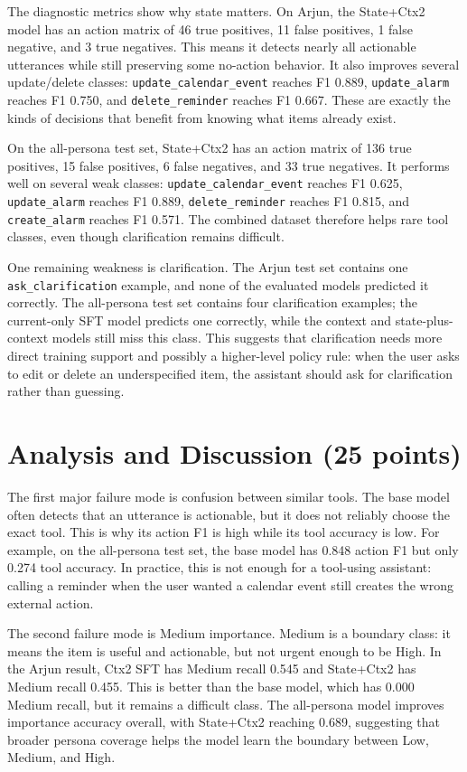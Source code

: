 \documentclass[11pt,a4paper]{article}
\begin{document}
The diagnostic metrics show why state matters. On Arjun, the State+Ctx2 model has an action matrix of 46 true positives, 11 false positives, 1 false negative, and 3 true negatives. This means it detects nearly all actionable utterances while still preserving some no-action behavior. It also improves several update/delete classes: \texttt{update\_calendar\_event} reaches F1 0.889, \texttt{update\_alarm} reaches F1 0.750, and \texttt{delete\_reminder} reaches F1 0.667. These are exactly the kinds of decisions that benefit from knowing what items already exist.

On the all-persona test set, State+Ctx2 has an action matrix of 136 true positives, 15 false positives, 6 false negatives, and 33 true negatives. It performs well on several weak classes: \texttt{update\_calendar\_event} reaches F1 0.625, \texttt{update\_alarm} reaches F1 0.889, \texttt{delete\_reminder} reaches F1 0.815, and \texttt{create\_alarm} reaches F1 0.571. The combined dataset therefore helps rare tool classes, even though clarification remains difficult.

One remaining weakness is clarification. The Arjun test set contains one \texttt{ask\_clarification} example, and none of the evaluated models predicted it correctly. The all-persona test set contains four clarification examples; the current-only SFT model predicts one correctly, while the context and state-plus-context models still miss this class. This suggests that clarification needs more direct training support and possibly a higher-level policy rule: when the user asks to edit or delete an underspecified item, the assistant should ask for clarification rather than guessing.

\section{Analysis and Discussion (25 points)}

The first major failure mode is confusion between similar tools. The base model often detects that an utterance is actionable, but it does not reliably choose the exact tool. This is why its action F1 is high while its tool accuracy is low. For example, on the all-persona test set, the base model has 0.848 action F1 but only 0.274 tool accuracy. In practice, this is not enough for a tool-using assistant: calling a reminder when the user wanted a calendar event still creates the wrong external action.

The second failure mode is Medium importance. Medium is a boundary class: it means the item is useful and actionable, but not urgent enough to be High. In the Arjun result, Ctx2 SFT has Medium recall 0.545 and State+Ctx2 has Medium recall 0.455. This is better than the base model, which has 0.000 Medium recall, but it remains a difficult class. The all-persona model improves importance accuracy overall, with State+Ctx2 reaching 0.689, suggesting that broader persona coverage helps the model learn the boundary between Low, Medium, and High.
\end{document}
